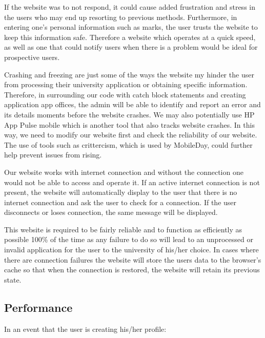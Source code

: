 \documentclass[a4paper, 12pt]{article}
\begin{document}
If the website was to not respond, it could cause added frustration and stress in the users who may end up resorting to previous methods. Furthermore, in entering one's personal information such as marks, the user trusts the website to keep this information safe. Therefore a website which operates at a quick speed, as well as one that could notify users when there is a problem would be ideal for prospective users. 

Crashing and freezing are just some of the ways the website my hinder the user from processing their university application or obtaining specific information. Therefore, in surrounding our code with catch block statements and creating application app offices, the admin will be able to identify and report an error and its details moments before the website crashes. We may also potentially use HP App Pulse mobile which is another tool that also tracks website crashes. In this way, we need to modify our website first and check the reliability of our website. The use of tools such as crittercism, which is used by MobileDay, could further help prevent issues from rising.

Our website works with internet connection and without the connection one would not be able to access and operate it. If an active internet connection is not present, the website will automatically display to the user that there is no internet connection and ask the user to check for a connection. If the user disconnects or loses connection, the same message will be displayed.

This website is required to be fairly reliable and to function as efficiently as possible 100\% of the time as any failure to do so will lead to an unprocessed or invalid application for the user to the university of his/her choice. In cases where there are connection failures the website will store the users data to the browser's cache so that when the connection is restored, the website will retain its previous state.

\subsection{Performance}

In an event that the user is creating his/her profile:
\end{document}
